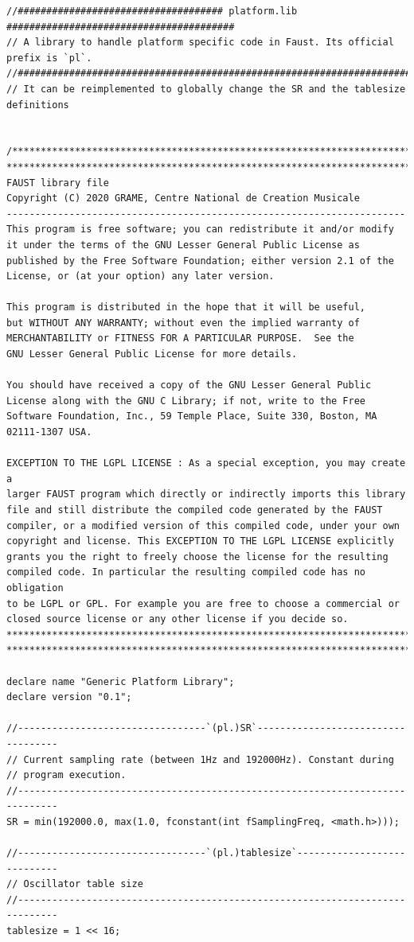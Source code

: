 \documentclass{article}
\begin{document}
\bigskip\bigskip
\begin{lstlisting}[caption=\texttt{platform.lib}]
//#################################### platform.lib ########################################
// A library to handle platform specific code in Faust. Its official prefix is `pl`.
//########################################################################################
// It can be reimplemented to globally change the SR and the tablesize definitions


/************************************************************************
************************************************************************
FAUST library file
Copyright (C) 2020 GRAME, Centre National de Creation Musicale
----------------------------------------------------------------------
This program is free software; you can redistribute it and/or modify
it under the terms of the GNU Lesser General Public License as
published by the Free Software Foundation; either version 2.1 of the
License, or (at your option) any later version.

This program is distributed in the hope that it will be useful,
but WITHOUT ANY WARRANTY; without even the implied warranty of
MERCHANTABILITY or FITNESS FOR A PARTICULAR PURPOSE.  See the
GNU Lesser General Public License for more details.

You should have received a copy of the GNU Lesser General Public
License along with the GNU C Library; if not, write to the Free
Software Foundation, Inc., 59 Temple Place, Suite 330, Boston, MA
02111-1307 USA.

EXCEPTION TO THE LGPL LICENSE : As a special exception, you may create a
larger FAUST program which directly or indirectly imports this library
file and still distribute the compiled code generated by the FAUST
compiler, or a modified version of this compiled code, under your own
copyright and license. This EXCEPTION TO THE LGPL LICENSE explicitly
grants you the right to freely choose the license for the resulting
compiled code. In particular the resulting compiled code has no obligation
to be LGPL or GPL. For example you are free to choose a commercial or
closed source license or any other license if you decide so.
************************************************************************
************************************************************************/

declare name "Generic Platform Library";
declare version "0.1";

//---------------------------------`(pl.)SR`-----------------------------------
// Current sampling rate (between 1Hz and 192000Hz). Constant during
// program execution.
//-----------------------------------------------------------------------------
SR = min(192000.0, max(1.0, fconstant(int fSamplingFreq, <math.h>)));

//---------------------------------`(pl.)tablesize`----------------------------
// Oscillator table size
//-----------------------------------------------------------------------------
tablesize = 1 << 16;
\end{lstlisting}
\end{document}
